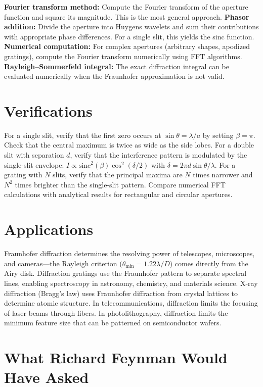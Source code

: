 \documentclass[11pt,openright]{book}
\begin{document}
\textbf{Fourier transform method:} Compute the Fourier transform of the aperture function and square its magnitude. This is the most general approach. \textbf{Phasor addition:} Divide the aperture into Huygens wavelets and sum their contributions with appropriate phase differences. For a single slit, this yields the sinc function. \textbf{Numerical computation:} For complex apertures (arbitrary shapes, apodized gratings), compute the Fourier transform numerically using FFT algorithms. \textbf{Rayleigh--Sommerfeld integral:} The exact diffraction integral can be evaluated numerically when the Fraunhofer approximation is not valid.
\section*{Verifications}

For a single slit, verify that the first zero occurs at $\sin\theta = \lambda/a$ by setting $\beta = \pi$. Check that the central maximum is twice as wide as the side lobes. For a double slit with separation $d$, verify that the interference pattern is modulated by the single-slit envelope: $I \propto \text{sinc}^2(\beta)\cos^2(\delta/2)$ with $\delta = 2\pi d\sin\theta/\lambda$. For a grating with $N$ slits, verify that the principal maxima are $N$ times narrower and $N^2$ times brighter than the single-slit pattern. Compare numerical FFT calculations with analytical results for rectangular and circular apertures.
\section*{Applications}

Fraunhofer diffraction determines the resolving power of telescopes, microscopes, and cameras---the Rayleigh criterion ($\theta_{\min} = 1.22\lambda/D$) comes directly from the Airy disk. Diffraction gratings use the Fraunhofer pattern to separate spectral lines, enabling spectroscopy in astronomy, chemistry, and materials science. X-ray diffraction (Bragg's law) uses Fraunhofer diffraction from crystal lattices to determine atomic structure. In telecommunications, diffraction limits the focusing of laser beams through fibers. In photolithography, diffraction limits the minimum feature size that can be patterned on semiconductor wafers.
\section*{What Richard Feynman Would Have Asked}
\end{document}

